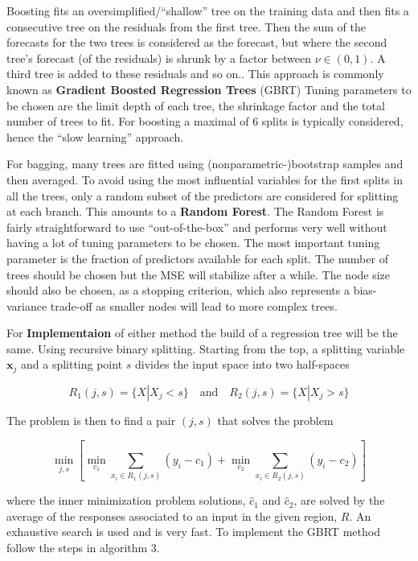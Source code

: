 \documentclass[11pt]{article}
\begin{document}
Boosting fits an oversimplified/``shallow'' tree on the training data
and then fits a consecutive tree on the residuals from the first tree.
Then the sum of the forecasts for the two trees is considered as the
forecast, but where the second tree's forecast (of the residuals) is
shrunk by a factor between \(\nu \in (0,1)\). A third tree is added to
these residuals and so on.. This approach is commonly known as \textbf{Gradient Boosted Regression Trees} (GBRT) Tuning parameters to be chosen are the limit
depth of each tree, the shrinkage factor and the total number of trees
to fit. For boosting a maximal of 6 splits is typically considered,
hence the ``slow learning'' approach.

For bagging, many trees are fitted using (nonparametric-)bootstrap
samples and then averaged. To avoid using the most influential variables
for the first splits in all the trees, only a random subset of the
predictors are considered for splitting at each branch. This amounts to
a \textbf{Random Forest}. The Random Forest is fairly straightforward to
use ``out-of-the-box'' and performs very well without having a lot of
tuning parameters to be chosen. The most important tuning parameter is
the fraction of predictors available for each split. The number of trees
should be chosen but the MSE will stabilize after a while. The node size
should also be chosen, as a stopping criterion, which also represents a
bias-variance trade-off as smaller nodes will lead to more complex
trees.

For \textbf{Implementaion} of either method the build of a regression tree will be the same. Using recursive binary splitting. Starting from the top, a splitting variable \(\bm{x}_j\) and a splitting point \(s\) divides the input space into two half-spaces

\[
R_1(j,s) = \{X|X_j < s\} \quad \textrm{and} \quad R_2(j,s) = \{X|X_j > s\}    
\]

The problem is then to find a pair \((j,s)\) that solves the problem

\[
\min_{j,s}  [ \min_{c_1} \sum_{x_i \in R_1(j,s)} (y_i - c_1) + \min_{c_2} \sum_{x_i \in R_2(j,s)} (y_i - c_2)  ]  
\]

where the inner minimization problem solutions, \(\hat{c}_1\) and \(\hat{c}_2\), are solved by the average of the responses associated to an input in the given region, \(R\). An exhaustive search is used and is very fast. To implement the GBRT method follow the steps in algorithm 3.
\end{document}

